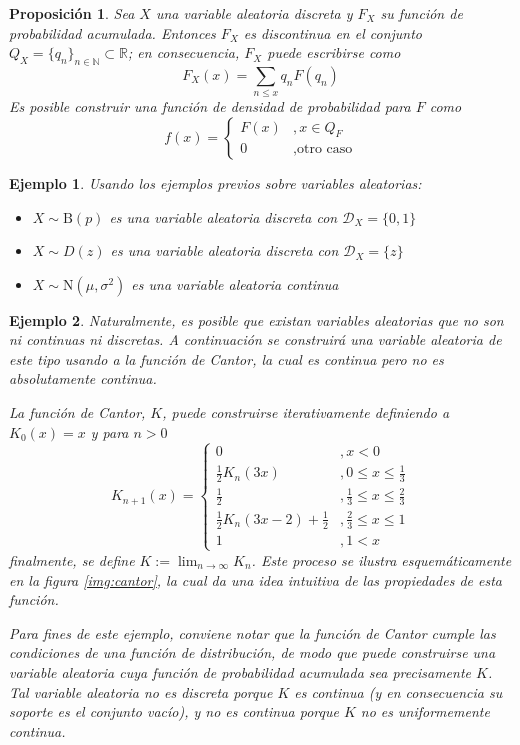 \documentclass[12pt,letterpaper]{book}
\newtheorem{proposicion}[teorema]{Proposición}
\newtheorem{ejemplo}{Ejemplo}[chapter]
\newcommand{\R}{\mathbb{R}}
\newcommand{\N}{\mathbb{N}}
\begin{document}
\begin{proposicion}
Sea $X$ una variable aleatoria discreta y $F_X$ su función de probabilidad acumulada.
%
Entonces $F_X$ es discontinua en el conjunto $Q_X=\{q_n\}_{n\in \N} \subset \R$; en consecuencia, $F_X$ puede escribirse como 
\begin{equation}
F_X(x) = \sum_{n\leq x} q_n F({q_n})
\end{equation}
Es posible construir una función de densidad de probabilidad para $F$ como
\begin{equation}
f(x) = \begin{cases}
F({x}) &, x\in Q_F \\
0 &, \text{otro caso}
\end{cases}
\end{equation}
\end{proposicion}

\begin{ejemplo}
Usando los ejemplos previos sobre variables aleatorias:
\begin{itemize}
\item $X\sim \text{B}(p)$ es una variable aleatoria discreta con $\mathcal{D}_X = \{0,1\}$
\item $X\sim D(z)$ es una variable aleatoria discreta con $\mathcal{D}_X = \{z\}$
\item $X\sim \text{N}(\mu,\sigma^{2})$ es una variable aleatoria continua
\end{itemize}
\end{ejemplo}

\begin{ejemplo}
Naturalmente, es posible que existan variables aleatorias que no son ni continuas ni discretas.
%
A continuación se construirá una variable aleatoria de este tipo usando a la función de Cantor, la cual es continua pero no es absolutamente continua.

La función de Cantor, $K$, puede construirse iterativamente definiendo a $K_0(x) = x$ y para $n>0$
\begin{equation}
K_{n+1}(x) =
\begin{cases}
0 &, x < 0 \\
\frac{1}{2} K_n(3 x) &, 0\leq x \leq \frac{1}{3} \\
\frac{1}{2} &, \frac{1}{3} \leq x \leq \frac{2}{3} \\
\frac{1}{2} K_n(3 x-2) + \frac{1}{2} &, \frac{2}{3}\leq x \leq 1 \\
1 &, 1 < x
\end{cases}
\end{equation}
finalmente, se define $K := \lim_{n\rightarrow \infty} K_n$. Este proceso se ilustra esquemáticamente en la figura \ref{img:cantor}, la cual da una idea intuitiva de las propiedades de esta función.

Para fines de este ejemplo, conviene notar que la función de Cantor cumple las condiciones de una función de distribución, de modo que puede construirse una variable aleatoria cuya función de probabilidad acumulada sea precisamente $K$.
%
Tal variable aleatoria no es discreta porque $K$ es continua (y en consecuencia su soporte es el conjunto vacío), y no es continua porque $K$ no es uniformemente continua.
\end{ejemplo}
\end{document}
